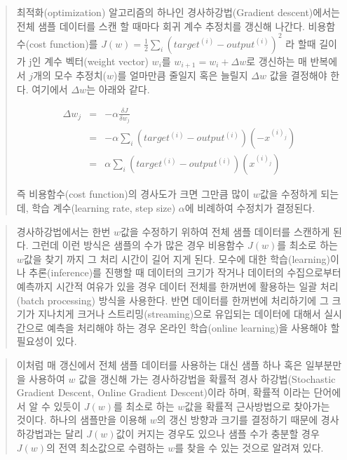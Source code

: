 \documentclass[11pt]{article}
\begin{document}
    \begin{quote}
최적화(optimization) 알고리즘의 하나인 경사하강법(Gradient
descent)에서는 전체 샘플 데이터를 스캔 할 때마다 회귀 계수 추정치를
갱신해 나간다. 비용함수(cost function)를
\(J(w) = \frac{1}{2} \sum_{i}(target^{(i)} - output^{(i)})^{2}\) 라 할때
길이가 j인 계수 벡터(weight vector) \(w_i\)를
\(w_{i+1}=w_{i}+\Delta w\)로 갱신하는 매 반복에서 \(j\)개의 모수
추정치(\(w\))를 얼마만큼 줄일지 혹은 늘릴지 \(\Delta w\) 값을 결정해야
한다. 여기에서 \(\Delta w\)는 아래와 같다.

\begin{eqnarray}
\Delta w_{j}    &=& -\alpha \frac{\delta J}{\delta w_{j}} \\
&=& -\alpha \sum_{i}(target^{(i)} - output^{(i)})(-x^{(i)_{j}}) \\
&=& \alpha \sum_{i}(target^{(i)} - output^{(i)})(x^{(i)_{j}})
\end{eqnarray}

즉 비용함수(cost function)의 경사도가 크면 그만큼 많이 \(w\)값을
수정하게 되는데, 학습 계수(learning rate, step size) \(\alpha\)에
비례하여 수정치가 결정된다.
\end{quote}

\begin{quote}
경사하강법에서는 한번 \(w\)값을 수정하기 위하여 전체 샘플 데이터를
스캔하게 된다. 그런데 이런 방식은 샘플의 수가 많은 경우 비용함수
\(J(w)\)를 최소로 하는 \(w\)값을 찾기 까지 그 처리 시간이 길어 지게
된다. 모수에 대한 학습(learning)이나 추론(inference)를 진행할 때
데이터의 크기가 작거나 데이터의 수집으로부터 예측까지 시간적 여유가 있을
경우 데이터 전체를 한꺼번에 활용하는 일괄 처리(batch processing) 방식을
사용한다. 반면 데이터를 한꺼번에 처리하기에 그 크기가 지나치게 크거나
스트리밍(streaming)으로 유입되는 데이터에 대해서 실시간으로 예측을
처리해야 하는 경우 온라인 학습(online learning)을 사용해야 할 필요성이
있다.
\end{quote}

\begin{quote}
이처럼 매 갱신에서 전체 샘플 데이터를 사용하는 대신 샘플 하나 혹은
일부분만을 사용하여 \(w\) 값을 갱신해 가는 경사하강법을 확률적 경사
하강법(Stochastic Gradient Descent, Online Gradient Descent)이라 하며,
확률적 이라는 단어에서 알 수 있듯이 \(J(w)\)를 최소로 하는 \(w\)값을
확률적 근사방법으로 찾아가는 것이다. 하나의 샘플만을 이용해 \(w\)의 갱신
방향과 크기를 결정하기 때문에 경사하강법과는 달리 \(J(w)\)값이 커지는
경우도 있으나 샘플 수가 충분할 경우 \(J(w)\)의 전역 최소값으로 수렴하는
\(w\)를 찾을 수 있는 것으로 알려져 있다.
\end{quote}
\end{document}
